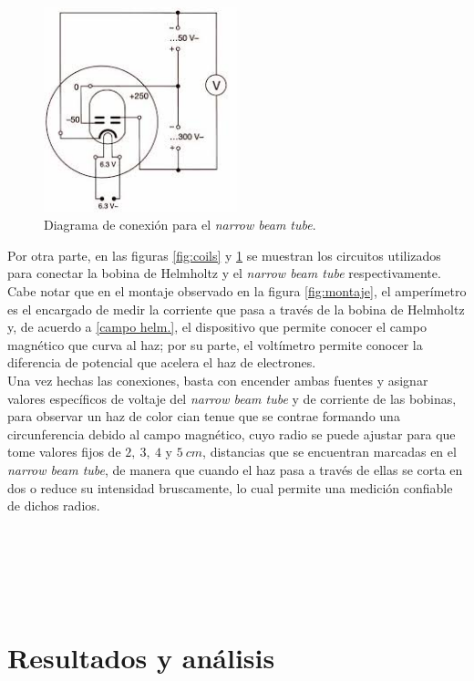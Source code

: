 \documentclass[prb,aps,twocolumn,preprintnumbers,amsmath,amssymb]{revtex4}
\begin{document}
\begin{figure}[h!]
	\centering
	\includegraphics[width=0.5\textwidth,height=0.25\textheight]{narrow-beam-tube}
	\caption{Diagrama de conexión para el \textit{narrow beam tube}.}
	\label{fig:tube}
\end{figure}

Por otra parte, en las figuras \ref{fig:coils} y \ref{fig:tube} se muestran los circuitos utilizados para conectar la bobina de Helmholtz y el \textit{narrow beam tube} respectivamente. Cabe notar que en el montaje observado en la figura \ref{fig:montaje}, el amperímetro es el encargado de medir la corriente que pasa a través de la bobina de Helmholtz y, de acuerdo a \eqref{campo helm.}, el dispositivo que permite conocer el campo magnético que curva al haz; por su parte, el voltímetro permite conocer la diferencia de potencial que acelera el haz de electrones.\\

Una vez hechas las conexiones, basta con encender ambas fuentes y asignar valores específicos de voltaje del \textit{narrow beam tube} y de corriente de las bobinas, para observar un haz de color cian tenue que se contrae formando una circunferencia debido al campo magnético, cuyo radio se puede ajustar para que tome valores fijos de $2,\ 3,\ 4$ y $5\ cm$, distancias que se encuentran marcadas en el \textit{narrow beam tube}, de manera que cuando el haz pasa a través de ellas se corta en dos o reduce su intensidad bruscamente, lo cual permite una medición confiable de dichos radios.\\\\\\\\\\\\



\section{Resultados y análisis}
\end{document}
